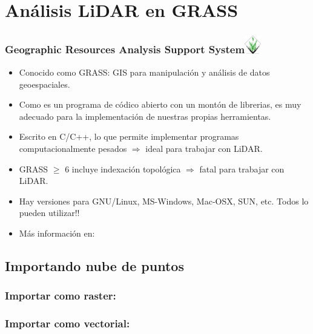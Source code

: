 \section{Análisis LiDAR en GRASS}
\begin{frame}
    \frametitle{Geographic Resources Analysis Support System\hfill \includegraphics[width=0.7cm]{images/grasslogo_transp_big.png}} 
     \begin{itemize}
	\item Conocido como \alert<1>{GRASS}: GIS para manipulación y análisis de datos geoespaciales.
	\item Como es un programa de \alert{códico abierto} con un montón de librerias, es muy adecuado para la implementación de nuestras propias herramientas.
	\item Escrito en C/C++, lo que permite implementar programas computacionalmente pesados $\Rightarrow$ \alert{ideal} para trabajar con LiDAR.
	\item GRASS $\geq$ 6 incluye indexación topológica $\Rightarrow$ \alert{fatal} para trabajar con LiDAR.
	\item Hay versiones para GNU/Linux, MS-Windows, Mac-OSX, SUN, etc. \alert{\textexclamdown\textexclamdown Todos lo pueden utilizar!!}
	\item Más información en:
    \end{itemize}
\end{frame}
\subsection{Importando nube de puntos}
\begin{frame}
 \frametitle{Importar como raster: \LARGE{}}
\end{frame}
\begin{frame}
 \frametitle{Importar como vectorial: \LARGE{}}
\end{frame}
